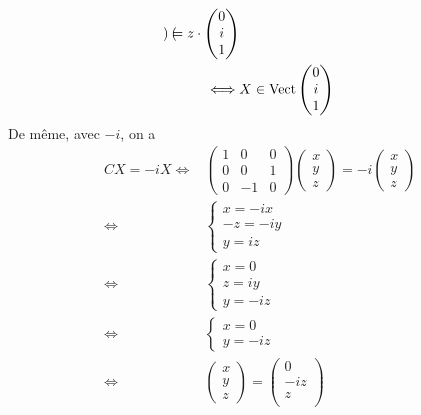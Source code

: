\begin{exo}
\begin{enumerate}
\begin{align*}
\begin{pmatrix}
				\end{pmatrix} = z \cdot \begin{pmatrix}
					0\\i\\1
				\end{pmatrix}\\
				\iff& X \in \operatorname{Vect}\begin{pmatrix}
					0\\i\\1
				\end{pmatrix}
			\end{align*}
			De même, avec $-i$, on a
			\begin{align*}
				CX = -i X \iff& \begin{pmatrix}
					1&0&0\\
					0&0&1\\
					0&-1&0
				\end{pmatrix} \begin{pmatrix}
					x\\y\\z
				\end{pmatrix} = -i \begin{pmatrix}
					x\\y\\z
				\end{pmatrix}\\
				\iff& \begin{cases}
					x = -i x\\
					-z = -iy\\
					y = iz
				\end{cases}\\
				\iff&\begin{cases}
					x = 0\\
					z = iy\\
					y = -iz
				\end{cases}\\
				\iff& \begin{cases}
					x=0\\
					y = -iz
				\end{cases}\\
				\iff& \begin{pmatrix}
					x\\y\\z
				\end{pmatrix} = \begin{pmatrix}
					0\\
					-iz\\
					z\\

\end{pmatrix}
\end{align*}
\end{enumerate}
\end{exo}
